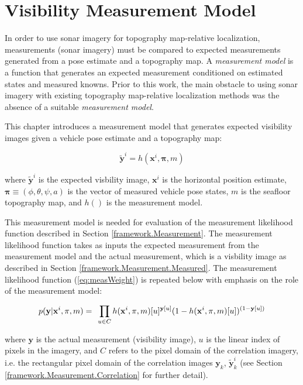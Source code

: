 
\chapter{Visibility Measurement Model}
\label{ch.MeasurementModel}

In order to use sonar imagery for topography map-relative localization, measurements (sonar imagery) must be compared to expected measurements generated from a pose estimate and a topography map.
A \emph{measurement model} is a function that generates an expected measurement conditioned on estimated states and measured knowns.
Prior to this work, the main obstacle to using sonar imagery with existing topography map-relative localization methods was the absence of a suitable \emph{measurement model}.

This chapter introduces a measurement model that generates expected visibility images given a vehicle pose estimate and a topography map:

\begin{equation}
\tilde{\mathbf{y}}^{i} = h(\mathbf{x}^{i},\mathbf{\pi}, m)
\label{eq:measModel}
\end{equation}

\noindent where $\tilde{\mathbf{y}}^{i}$ is the expected visbility image, $\mathbf{x}^{i}$ is the horizontal position estimate, $\mathbf{\pi} \equiv (\phi, \theta, \psi, a)$ is the vector of measured vehicle pose states, $m$ is the seafloor topography map, and $h()$ is the measurement model.

This measurement model is needed for evaluation of the measurement likelihood function described in Section \ref{framework.Measurement}.  The measurement likelihood function takes as inputs the expected measurement from the measurement model and the actual measurement, which is a visbility image as described in Section \ref{framework.Measurement.Measured}.  The measurement likelihood function (\ref{eq:measWeight}) is repeated below with emphasis on the role of the measurement model:

\begin{equation}
p(\mathbf{y} | \mathbf{x}^{i}, \mathbf{\pi}, m ) = \hspace{1ex} \prod_{u \in C} h(\mathbf{x}^{i},\mathbf{\pi}, m)[u]^{\mathbf{y}[u]} (1 - h(\mathbf{x}^{i},\mathbf{\pi}, m)[u])^{(1 - \mathbf{y}[u])} 
\label{eq:likelihoodMeasModel}
\end{equation}

\noindent where $\mathbf{y}$ is the actual measurement (visibility image), $u$ is the linear index of pixels in the imagery, and $C$ refers to the pixel domain of the correlation imagery, i.e. the rectangular pixel domain of the correlation images $\mathbf{y}_k$, $\tilde{\mathbf{y}}_k^{i}$ (see Section \ref{framework.Measurement.Correlation} for further detail). 

